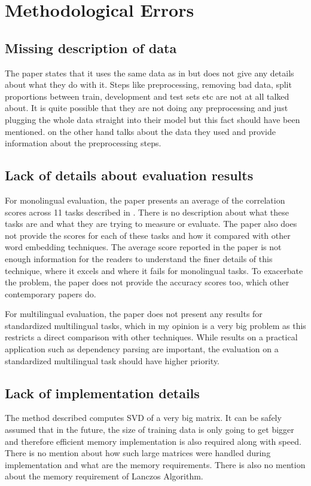 \documentclass[11pt]{article}
\begin{document}
\section{Methodological Errors}
\subsection{Missing description of data} \label{missingdata}
The paper states that it uses the same data as in \cite{faruqui2014improving} but does not give any details about what they do with it. Steps like preprocessing, removing bad data, split proportions between train, development and test sets etc are not at all talked about. It is quite possible that they are not doing any preprocessing and just plugging the whole data straight into their model but this fact should have been mentioned. \cite{faruqui2014improving} on the other hand talks about the data they used and provide information about the preprocessing steps.

\subsection{Lack of details about evaluation results}
For monolingual evaluation, the paper presents an average of the correlation scores across 11 tasks described in \cite{faruqui2014community}. There is no description about what these tasks are and what they are trying to measure or evaluate. The paper also does not provide the scores for each of these tasks and how it compared with other word embedding techniques. The average score reported in the paper is not enough information for the readers to understand the finer details of this technique, where it excels and where it fails for monolingual tasks. To exacerbate the problem, the paper does not provide the accuracy scores too, which other contemporary papers do.

For multilingual evaluation, the paper does not present any results for standardized multilingual tasks, which in my opinion is a very big problem as this restricts a direct comparison with other techniques. While results on a practical application such as dependency parsing are important, the evaluation on a standardized multilingual task should have higher priority.

\subsection{Lack of implementation details}
The method described computes SVD of a very big matrix. It can be safely assumed that in the future, the size of training data is only going to get bigger and therefore efficient memory implementation is also required along with speed. There is no mention about how such large matrices were handled during implementation and what are the memory requirements. There is also no mention about the memory requirement of Lanczos Algorithm.
\end{document}
